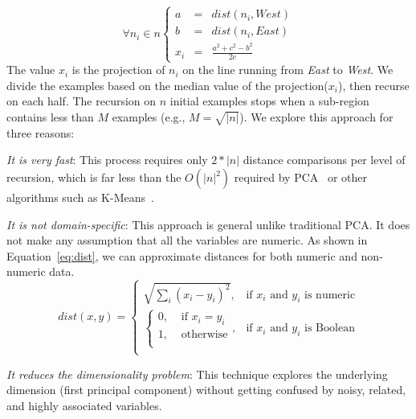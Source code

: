 \documentclass{sig-alternative}
\begin{document}
\[
\forall  n_i \in n \left\{\begin{array}{rcl}
a&=&\mathit{dist}(n_i,\mathit{West})\\
b&=&\mathit{dist}(n_i,\mathit{East})\\
x_i&=&\frac{a^2 + c^2 - b^2}{2c}
\end{array}
\]
The value $x_i$ is the projection of $n_i$
on the line  running  from {\em East} to {\em West}.  We divide
the examples based on the median value of the projection($x_i$),
then recurse on each half. The recursion on
$n$ initial
examples stops when a sub-region
contains less than  $M$ examples (e.g., 
$M=\sqrt{|n|}$).
We explore this approach for three reasons:
\begin{compactitem}
\item
{\em It is very fast}:
This process requires only $2*|n|$ distance comparisons
per level of recursion, which is far less than the $O(|n|^2)$
required by PCA~\cite{Du2008}
or other  algorithms such as K-Means~\cite{hamerly2010making}.
\item
{\em It is not domain-specific}:
This approach is general unlike traditional PCA. It does not make any assumption that all the variables are numeric. As shown in Equation~\ref{eq:dist}, we can approximate distances for both numeric and non-numeric data.
\begin{equation}
    dist(x, y) = 
    \begin{cases}
        \sqrt{\sum_i(x_i-y_i)^2},& \text{if $x_i$ and $y_i$ is numeric}\\
        \begin{cases}
            0, & \text{ if $x_i = y_i$}\\
            1, & \text{ otherwise}\\
        \end{cases}
        ,& \text{if $x_i$ and $y_i$ is Boolean}\\
    \end{cases}
    \label{eq:dist}
\end{equation}

\item
{\em It reduces the dimensionality problem}:
This technique explores the underlying dimension (first principal component) without getting confused by noisy, related, and highly associated variables.
\end{compactitem}
\end{document}
